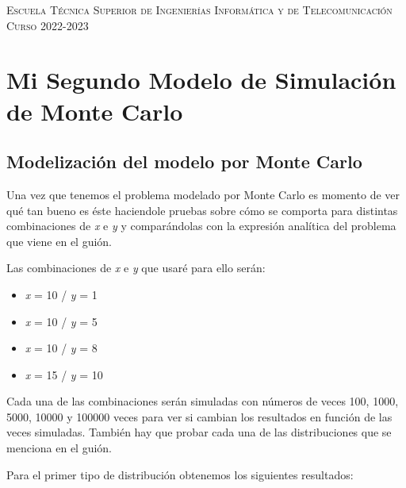 \documentclass[11pt,a4paper]{report}
\begin{document}
\begin{titlepage}
\begin{minipage}{\textwidth}
\vspace{0.7cm}
\textsc{Escuela Técnica Superior de Ingenierías Informática y de Telecomunicación}\\
\vspace{1cm}
\textsc{Curso 2022-2023}
\end{minipage}
\end{titlepage}

\tableofcontents
\thispagestyle{empty}				%

\newpage

\setlength{\parskip}{1em}

\chapter{Mi Segundo Modelo de Simulación de Monte Carlo}
\newpage
\section{Modelización del modelo por Monte Carlo}

Una vez que tenemos el problema modelado por Monte Carlo es momento de ver qué tan bueno es éste haciendole pruebas sobre cómo se comporta para distintas combinaciones de \textit{x} e \textit{y} y comparándolas con la expresión analítica del problema que viene en el guión.

Las combinaciones de \textit{x} e \textit{y} que usaré para ello serán:

\begin{itemize}
	\item \textit{x} = 10 / \textit{y} = 1
	\item \textit{x} = 10 / \textit{y} = 5
	\item \textit{x} = 10 / \textit{y} = 8
	\item \textit{x} = 15 / \textit{y} = 10
\end{itemize}

Cada una de las combinaciones serán simuladas con números de veces 100, 1000, 5000, 10000 y 100000 veces para ver si cambian los resultados en función de las veces simuladas. También hay que probar cada una de las distribuciones que se menciona en el guión.

Para el primer tipo de distribución obtenemos los siguientes resultados:
\end{document}
